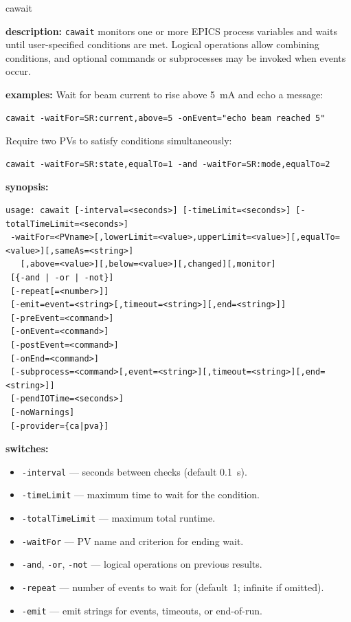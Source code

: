\begin{sddsprog}{cawait}
\item \textbf{description:}
\verb+cawait+ monitors one or more EPICS process variables and waits until
user-specified conditions are met. Logical operations allow combining
conditions, and optional commands or subprocesses may be invoked when
events occur.
\item \textbf{examples:}
Wait for beam current to rise above 5~mA and echo a message:
\begin{verbatim}
cawait -waitFor=SR:current,above=5 -onEvent="echo beam reached 5"
\end{verbatim}
Require two PVs to satisfy conditions simultaneously:
\begin{verbatim}
cawait -waitFor=SR:state,equalTo=1 -and -waitFor=SR:mode,equalTo=2
\end{verbatim}
\item \textbf{synopsis:}
\begin{verbatim}
usage: cawait [-interval=<seconds>] [-timeLimit=<seconds>] [-totalTimeLimit=<seconds>]
 -waitFor=<PVname>[,lowerLimit=<value>,upperLimit=<value>][,equalTo=<value>][,sameAs=<string>]
   [,above=<value>][,below=<value>][,changed][,monitor]
 [{-and | -or | -not}]
 [-repeat[=<number>]]
 [-emit=event=<string>[,timeout=<string>][,end=<string>]]
 [-preEvent=<command>]
 [-onEvent=<command>]
 [-postEvent=<command>]
 [-onEnd=<command>]
 [-subprocess=<command>[,event=<string>][,timeout=<string>][,end=<string>]]
 [-pendIOTime=<seconds>]
 [-noWarnings]
 [-provider={ca|pva}]
\end{verbatim}
\item \textbf{switches:}
\begin{itemize}
  \item {\tt -interval} --- seconds between checks (default 0.1~s).
  \item {\tt -timeLimit} --- maximum time to wait for the condition.
  \item {\tt -totalTimeLimit} --- maximum total runtime.
  \item {\tt -waitFor} --- PV name and criterion for ending wait.
  \item {\tt -and}, {\tt -or}, {\tt -not} --- logical operations on previous results.
  \item {\tt -repeat} --- number of events to wait for (default~1; infinite if omitted).
  \item {\tt -emit} --- emit strings for events, timeouts, or end-of-run.

\end{itemize}
\end{sddsprog}
